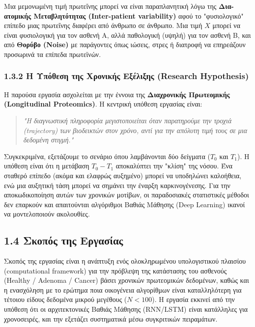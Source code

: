 Μια μεμονωμένη τιμή πρωτεΐνης μπορεί να είναι παραπλανητική λόγω της \textbf{Δια-ατομικής Μεταβλητότητας (Inter-patient variability)} αφού το "φυσιολογικό" επίπεδο μιας πρωτεΐνης διαφέρει από άνθρωπο σε άνθρωπο. Μια τιμή $X$ μπορεί να είναι φυσιολογική για τον ασθενή Α, αλλά παθολογική (υψηλή) για τον ασθενή Β, και από \textbf{Θορύβο (Noise)} με παράγοντες όπως ιώσεις, στρες ή διατροφή να επηρεάζουν προσωρινά τα επίπεδα πρωτεϊνών.

\subsubsection{1.3.2 Η Υπόθεση της Χρονικής Εξέλιξης (Research Hypothesis)}

Η παρούσα εργασία ασχολείται με την έννοια της \textbf{Διαχρονικής Πρωτεομικής (Longitudinal Proteomics)}. Η κεντρική υπόθεση εργασίας είναι:

\begin{quote}
\emph{"Η διαγνωστική πληροφορία μεγιστοποιείται όταν παρατηρούμε την τροχιά (trajectory) των βιοδεικτών στον χρόνο, αντί για την απόλυτη τιμή τους σε μια δεδομένη στιγμή."}
\end{quote}

Συγκεκριμένα, εξετάζουμε το σενάριο όπου λαμβάνονται δύο δείγματα ($T_0$ και $T_1$). Η υπόθεση είναι ότι η μετάβαση $T_0 - T_1$ αποκαλύπτει την "κλίση" της νόσου. Ένα σταθερό επίπεδο (ακόμα και ελαφρώς αυξημένο) μπορεί να υποδηλώνει καλοήθεια, ενώ μια αυξητική τάση μπορεί να σημάνει την έναρξη καρκινογένεσης. Για την αποκωδικοποίηση αυτών των χρονικών μοτίβων, οι παραδοσιακές στατιστικές μέθοδοι δεν επαρκούν και απαιτούνται αλγόριθμοι Βαθιάς Μάθησης (Deep Learning) ικανοί να μοντελοποιούν ακολουθίες.

\subsection{1.4 Σκοπός της Εργασίας}

Σκοπός της εργασίας είναι η ανάπτυξη ενός ολοκληρωμένου υπολογιστικού πλαισίου (computational framework) για την πρόβλεψη της κατάστασης του ασθενούς (Healthy / Adenoma / Cancer) βάσει χρονικών πρωτεομικών δεδομένων, καθώς και η ενασχόληση με το ερώτημα ποια οικογένεια αλγορίθμων είναι καταλληλότερη για τέτοιου είδους δεδομένα μικρού μεγέθους ($N < 100$). Η εργασία εκκινεί από την υπόθεση ότι οι αρχιτεκτονικές Βαθιάς Μάθησης (RNN/LSTM) είναι κατάλληλες για χρονοσειρές, και την εξετάζει συστηματικά μέσω συγκριτικών πειραμάτων.

